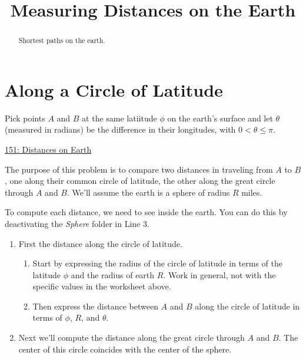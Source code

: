 \documentclass{ximera}
\title{Measuring Distances on the Earth}
\begin{document}
\begin{abstract}
Shortest paths on the earth.
\end{abstract}
\maketitle


\section{Along a Circle of Latitude}

\begin{question} \label{Q34dgbnhhtrg}

Pick points $A$ and $B$ at the same latiitude $\phi$ on the earth's surface and let $\theta$ (measured in radians) be the difference in their longitudes, with $0<\theta \leq \pi$.

\begin{onlineOnly}
   \begin{center}
\end{center}
\end{onlineOnly}

\href{https://www.desmos.com/3d/hhpog6ijnr}{151: Distances on Earth}

The purpose of this problem is to compare two distances in traveling from $A$ to $B$, one along their common circle of latitude, the other along the great circle through $A$ and $B$. We'll assume the earth is a sphere of radius $R$ miles.

To compute each distance, we need to see inside the earth. You can do this by deactivating the \emph{Sphere} folder in Line 3.

\begin{enumerate}
\item First the distance along the circle of latitude.

\begin{enumerate}
\item Start by expressing the radius of the circle of latitude in terms of the latitude $\phi$ and the radius of earth $R$. Work in general, not with the specific values in the worksheet above.

\item Then express the distance between $A$ and $B$ along the circle of latitude in terms of $\phi$, $R$, and $\theta$.
\end{enumerate}

\item Next we'll compute the distance along the great circle through $A$ and $B$. The center of this circle coincides with the center of the sphere.


\end{enumerate}
\end{question}
\end{document}
